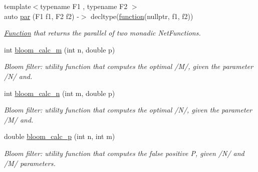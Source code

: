 \begin{DoxyCompactItemize}
{\footnotesize template$<$typename F1 , typename F2 $>$ }\\auto \hyperlink{namespacepfq_1_1lang_1_1anonymous__namespace_02default_8hpp_03_a34805fabe99c4a438ed0a3658e1697a5}{par} (F1 f1, F2 f2) -\/$>$ decltype(\hyperlink{namespacepfq_1_1lang_a1a4638059d700ae08d0ca63886ff2bb3}{function}(nullptr, f1, f2))
\begin{DoxyCompactList}\small\item\em \hyperlink{structpfq_1_1lang_1_1Function}{Function} that returns the parallel of two monadic Net\+Functions. \end{DoxyCompactList}\item 
int \hyperlink{namespacepfq_1_1lang_1_1anonymous__namespace_02default_8hpp_03_a69262c3acb476a85eb29e16540ae3f08}{bloom\+\_\+calc\+\_\+m} (int n, double p)
\begin{DoxyCompactList}\small\item\em Bloom filter\+: utility function that computes the optimal /\+M/, given the parameter /\+N/ and. \end{DoxyCompactList}\item 
int \hyperlink{namespacepfq_1_1lang_1_1anonymous__namespace_02default_8hpp_03_a2385e61b93ec1d91ce7117fe787bae7e}{bloom\+\_\+calc\+\_\+n} (int m, double p)
\begin{DoxyCompactList}\small\item\em Bloom filter\+: utility function that computes the optimal /\+N/, given the parameter /\+M/ and. \end{DoxyCompactList}\item 
double \hyperlink{namespacepfq_1_1lang_1_1anonymous__namespace_02default_8hpp_03_a8d0641a00fb27e53db78af7572b1b3a6}{bloom\+\_\+calc\+\_\+p} (int n, int m)
\begin{DoxyCompactList}\small\item\em Bloom filter\+: utility function that computes the false positive P, given /\+N/ and /\+M/ parameters. \end{DoxyCompactList}\end{DoxyCompactItemize}
